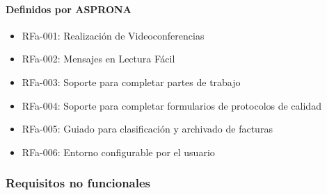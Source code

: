 \paragraph{Definidos por ASPRONA}
\begin{itemize}
\item RFa-001: Realización de Videoconferencias
\item RFa-002: Mensajes en Lectura Fácil
\item RFa-003: Soporte para completar partes de trabajo
\item RFa-004: Soporte para completar formularios de protocolos de calidad
\item RFa-005: Guiado para clasificación y archivado de facturas
\item RFa-006: Entorno configurable por el usuario
\end{itemize}
\subsubsection{Requisitos no funcionales}

